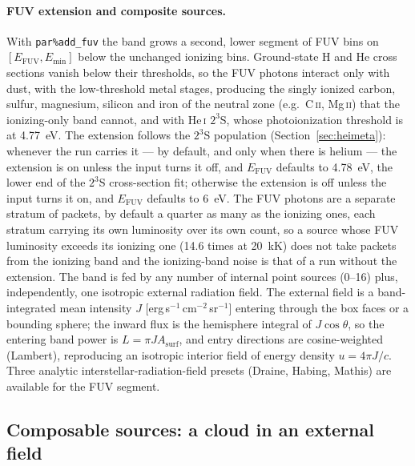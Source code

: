 \documentclass[twocolumn,linenumbers]{aastex702}
\newcommand{\code}[1]{\texttt{#1}}
\newcommand{\HeI}{He\,\textsc{i}}
\begin{document}
\paragraph{FUV extension and composite sources.}  With \code{par\%add\_fuv}
the band grows a second, lower segment of FUV bins on
$[E_{\mathrm{FUV}}, E_{\min}]$ below the unchanged ionizing bins.
Ground-state H and He cross sections vanish below their thresholds, so the
FUV photons interact only with dust, with the low-threshold metal stages,
producing the singly ionized carbon, sulfur, magnesium, silicon and iron
of the neutral zone (e.g.\ C\,\textsc{ii}, Mg\,\textsc{ii}) that the
ionizing-only band cannot, and with \HeI{} $2^3$S, whose photoionization
threshold is at 4.77~eV.  The extension follows the $2^3$S population
(Section~\ref{sec:heimeta}): whenever the run carries it --- by default,
and only when there is helium --- the extension is on unless the input
turns it off, and $E_{\mathrm{FUV}}$ defaults to 4.78~eV, the lower end of
the $2^3$S cross-section fit; otherwise the extension is off unless the
input turns it on, and $E_{\mathrm{FUV}}$ defaults to 6~eV.  The FUV photons are a
separate stratum of packets, by default a quarter as many as the ionizing
ones, each stratum carrying its own luminosity over its own count, so a
source whose FUV luminosity exceeds its ionizing one (14.6 times at
20~kK) does not take packets from the ionizing band and the ionizing-band
noise is that of a run without the extension.  The band is fed by any number of internal point sources
(0--16) plus, independently, one isotropic external radiation field.  The
external field is a band-integrated mean intensity $J$
[erg\,s$^{-1}$\,cm$^{-2}$\,sr$^{-1}$] entering through
the box faces or a bounding sphere; the inward flux is the hemisphere
integral of $J\cos\theta$, so the entering band power is $L = \pi J
A_{\mathrm{surf}}$, and entry directions are cosine-weighted (Lambert),
reproducing an isotropic interior field of energy density $u = 4\pi
J/c$.  Three analytic interstellar-radiation-field presets (Draine,
Habing, Mathis) are available for the FUV segment.

\subsection{Composable sources: a cloud in an external field}
\label{sec:external}
\end{document}
